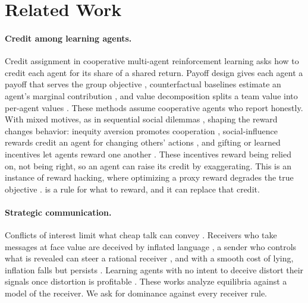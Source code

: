 \section{Related Work}
\label{sec:related}

\paragraph{Credit among learning agents.}
Credit assignment in cooperative multi-agent reinforcement learning asks how to credit each agent for its share of a shared return. Payoff design gives each agent a payoff that serves the group objective \citep{wolpert2001optimal}, counterfactual baselines estimate an agent's marginal contribution \citep{foerster2018coma}, and value decomposition splits a team value into per-agent values \citep{sunehag2018value,rashid2018qmix}. These methods assume cooperative agents who report honestly. With mixed motives, as in sequential social dilemmas \citep{leibo2017multi}, shaping the reward changes behavior: inequity aversion promotes cooperation \citep{hughes2018inequity}, social-influence rewards credit an agent for changing others' actions \citep{jaques2019social}, and gifting or learned incentives let agents reward one another \citep{lupu2020gifting,yang2020lio}. These incentives reward being relied on, not being right, so an agent can raise its credit by exaggerating. This is an instance of reward hacking, where optimizing a proxy reward degrades the true objective \citep{amodei2016concrete,skalse2022defining}. \tvc{} is a rule for what to reward, and it can replace that credit.

\paragraph{Strategic communication.}
Conflicts of interest limit what cheap talk can convey \citep{crawford1982strategic}. Receivers who take messages at face value are deceived by inflated language \citep{kartik2007credulity}, a sender who controls what is revealed can steer a rational receiver \citep{kamenica2011bayesian}, and with a smooth cost of lying, inflation falls but persists \citep{kartik2009StrategicCommunicationLying}. Learning agents with no intent to deceive distort their signals once distortion is profitable \citep{alon2023disinformation}. These works analyze equilibria against a model of the receiver. We ask for dominance against every receiver rule.


